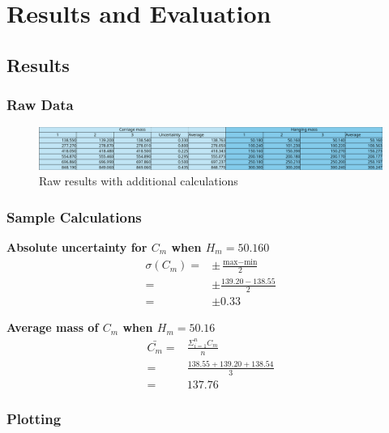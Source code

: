 \documentclass[11pt,a4paper]{article}
\begin{document}
\section{Results and Evaluation}
\subsection{Results}

\subsubsection{Raw Data}
\begin{center}
	\centering
	\begin{figure}[h]
		\centering
		\includegraphics[width=0.83\paperwidth]{resultstable.png}
		\caption{Raw results with additional calculations}
	\end{figure}
	
\end{center}


\subsubsection{Sample Calculations}
\begin{center}
\textbf{Absolute uncertainty for $C_m$ when $H_m=50.160$}
\begin{align*}
	\sigma(C_m)=&\pm\frac{\textrm{max}-\textrm{min}}{2}\\
	=&\pm\frac{139.20-138.55}{2}
	\\=&\pm0.33
\end{align*}
\newline


\textbf{Average mass of $C_m$ when $H_m=50.16$}
\begin{align*}
		\bar{C_m}=&\frac{\Sigma^n_{i=1}C_m}{n}\\
		=&\frac{138.55+139.20+138.54}{3}\\
		=&137.76
	\end{align*}
\end{center}

\subsubsection{Plotting}
\end{document}
